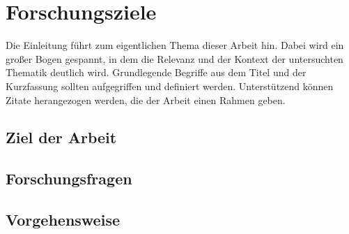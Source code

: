 
\chapter{Forschungsziele}

Die Einleitung führt zum eigentlichen Thema dieser Arbeit hin. Dabei wird ein großer Bogen gespannt, in dem die Relevanz und der Kontext der untersuchten Thematik deutlich wird. Grundlegende Begriffe aus dem Titel und der Kurzfassung sollten aufgegriffen und definiert werden. Unterstützend können Zitate herangezogen werden, die der Arbeit einen Rahmen geben.

\section{Ziel der Arbeit}


\section{Forschungsfragen}


\section{Vorgehensweise}
